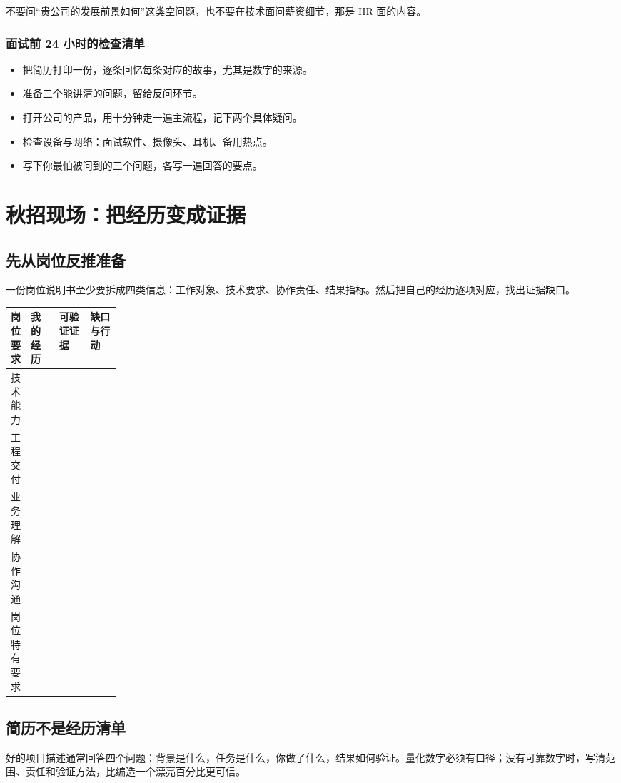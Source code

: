 \documentclass[UTF8,zihao=5,openany]{ctexbook}
\begin{document}
不要问“贵公司的发展前景如何”这类空问题，也不要在技术面问薪资细节，那是 HR 面的内容。

\subsection{面试前 24 小时的检查清单}
\begin{itemize}
\item 把简历打印一份，逐条回忆每条对应的故事，尤其是数字的来源。
\item 准备三个能讲清的问题，留给反问环节。
\item 打开公司的产品，用十分钟走一遍主流程，记下两个具体疑问。
\item 检查设备与网络：面试软件、摄像头、耳机、备用热点。
\item 写下你最怕被问到的三个问题，各写一遍回答的要点。
\end{itemize}


\chapter{秋招现场：把经历变成证据}
\section{先从岗位反推准备}
一份岗位说明书至少要拆成四类信息：工作对象、技术要求、协作责任、结果指标。然后把自己的经历逐项对应，找出证据缺口。

\begin{toolbox}
\begin{center}\footnotesize
\begin{tabularx}{0.94\linewidth}{p{0.18\linewidth}YYY}
\toprule
岗位要求 & 我的经历 & 可验证证据 & 缺口与行动 \\
\midrule
技术能力 & & & \\
工程交付 & & & \\
业务理解 & & & \\
协作沟通 & & & \\
岗位特有要求 & & & \\
\bottomrule
\end{tabularx}
\end{center}
\end{toolbox}

\section{简历不是经历清单}
好的项目描述通常回答四个问题：背景是什么，任务是什么，你做了什么，结果如何验证。量化数字必须有口径；没有可靠数字时，写清范围、责任和验证方法，比编造一个漂亮百分比更可信。
\end{document}
